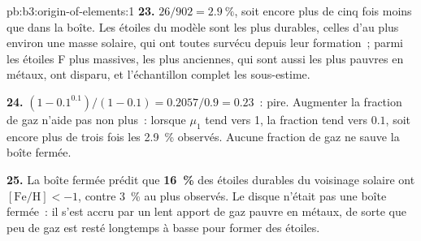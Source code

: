 \begin{solution}{pb:b3:origin-of-elements:1}
\textbf{23.} $26/902 = \qty{2.9}{\percent}$, soit encore plus de cinq fois moins que
dans la boîte. Les étoiles du modèle sont les plus durables, celles d'au plus
environ une masse solaire, qui ont toutes survécu depuis leur formation~; parmi
les étoiles F plus massives, les plus anciennes, qui sont aussi les plus pauvres
en métaux, ont disparu, et l'échantillon complet les sous-estime.

\textbf{24.} $(1 - 0.1^{0.1})/(1 - 0.1) = 0.2057/0.9 = \num{0.23}$~: pire.
Augmenter la fraction de gaz n'aide pas non plus~: lorsque $\mu_1$ tend vers 1,
la fraction tend vers $0.1$, soit encore plus de trois fois les
\qty{2.9}{\percent} observés. Aucune fraction de gaz ne sauve la boîte fermée.

\textbf{25.} La boîte fermée prédit que
\textbf{\qty[text-series-to-math=true]{16}{\percent}} des étoiles durables
du voisinage solaire ont $[\mathrm{Fe/H}] < -1$, contre \qty{3}{\percent}
au plus observés. Le disque n'était pas une boîte fermée~: il
s'est accru par un lent apport de gaz pauvre en métaux, de sorte que peu de gaz
est resté longtemps à basse  pour former des étoiles.
\end{solution}
